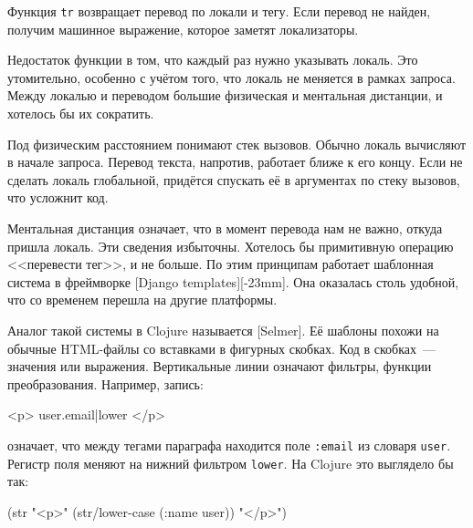 \fi


Функция \verb|tr| возвращает перевод по локали и тегу. Если перевод не найден,
получим машинное выражение, которое заметят локализаторы.

Недостаток функции в том, что каждый раз нужно указывать локаль. Это
утомительно, особенно с учётом того, что локаль не меняется в рамках
запроса. Между локалью и переводом большие физическая и ментальная
дистанции, и хотелось бы их сократить.


Под физическим расстоянием понимают стек вызовов. Обычно локаль вычисляют в
начале запроса. Перевод текста, напротив, работает ближе к его концу. Если не
сделать локаль глобальной, придётся спускать её в аргументах по стеку вызовов,
что усложнит код.


Ментальная дистанция означает, что в момент перевода нам не важно, откуда пришла
локаль. Эти сведения избыточны. Хотелось бы примитивную операцию <<перевести
тег>>, и не больше. По этим принципам работает шаблонная система в фреймворке
[Django templates][-23mm].
Она оказалась столь удобной, что со временем перешла на другие платформы.


Аналог такой системы в Clojure называется [Selmer].
Её шаблоны похожи на обычные HTML-файлы со вставками в фигурных скобках. Код в
скобках~--- значения или выражения. Вертикальные линии означают фильтры, функции
преобразования. Например, запись:

\begin{english}
  \begin{htmldjango}
<p>{{ user.email|lower }}</p>
  \end{htmldjango}
\end{english}

\noindent
означает, что между тегами параграфа находится поле \verb|:email| из словаря
\verb|user|. Регистр поля меняют на нижний фильтром \verb|lower|. На Clojure
это выглядело бы так:


\begin{english}
  \begin{clojure}
(str "<p>" (str/lower-case (:name user)) "</p>")
  \end{clojure}
\end{english}

